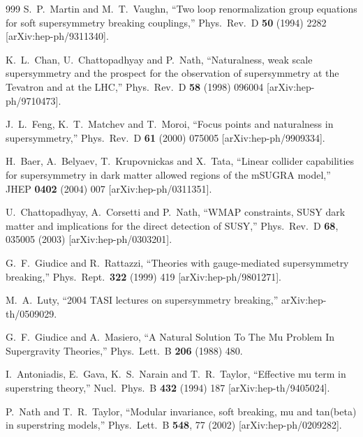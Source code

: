 \begin{thebibliography}{999}
  S.~P.~Martin and M.~T.~Vaughn,
  ``Two loop renormalization group equations for soft supersymmetry breaking
  couplings,''
  Phys.\ Rev.\ D {\bf 50} (1994) 2282
  [arXiv:hep-ph/9311340].

  K.~L.~Chan, U.~Chattopadhyay and P.~Nath,
  ``Naturalness, weak scale supersymmetry and the prospect for the  observation
  of supersymmetry at the Tevatron and at the LHC,''
  Phys.\ Rev.\ D {\bf 58} (1998) 096004
  [arXiv:hep-ph/9710473].

  J.~L.~Feng, K.~T.~Matchev and T.~Moroi,
  ``Focus points and naturalness in supersymmetry,''
  Phys.\ Rev.\ D {\bf 61} (2000) 075005
  [arXiv:hep-ph/9909334].

  H.~Baer, A.~Belyaev, T.~Krupovnickas and X.~Tata,
  ``Linear collider capabilities for supersymmetry in dark matter allowed
  regions of the mSUGRA model,''
  JHEP {\bf 0402} (2004) 007
  [arXiv:hep-ph/0311351].

U.~Chattopadhyay, A.~Corsetti and P.~Nath,
``WMAP constraints, SUSY dark matter and implications for the direct  detection of SUSY,''
Phys.\ Rev.\ D {\bf 68}, 035005 (2003)
[arXiv:hep-ph/0303201].

  G.~F.~Giudice and R.~Rattazzi,
  ``Theories with gauge-mediated supersymmetry breaking,''
  Phys.\ Rept.\  {\bf 322} (1999) 419
  [arXiv:hep-ph/9801271].

  M.~A.~Luty,
  ``2004 TASI lectures on supersymmetry breaking,''
  arXiv:hep-th/0509029.

  G.~F.~Giudice and A.~Masiero,
  ``A Natural Solution To The Mu Problem In Supergravity Theories,''
  Phys.\ Lett.\ B {\bf 206} (1988) 480.

  I.~Antoniadis, E.~Gava, K.~S.~Narain and T.~R.~Taylor,
  ``Effective mu term in superstring theory,''
  Nucl.\ Phys.\ B {\bf 432} (1994) 187
  [arXiv:hep-th/9405024].

  P.~Nath and T.~R.~Taylor,
  ``Modular invariance, soft breaking, mu and tan(beta) in superstring
  models,''
  Phys.\ Lett.\ B {\bf 548}, 77 (2002)
  [arXiv:hep-ph/0209282].


\end{thebibliography}
